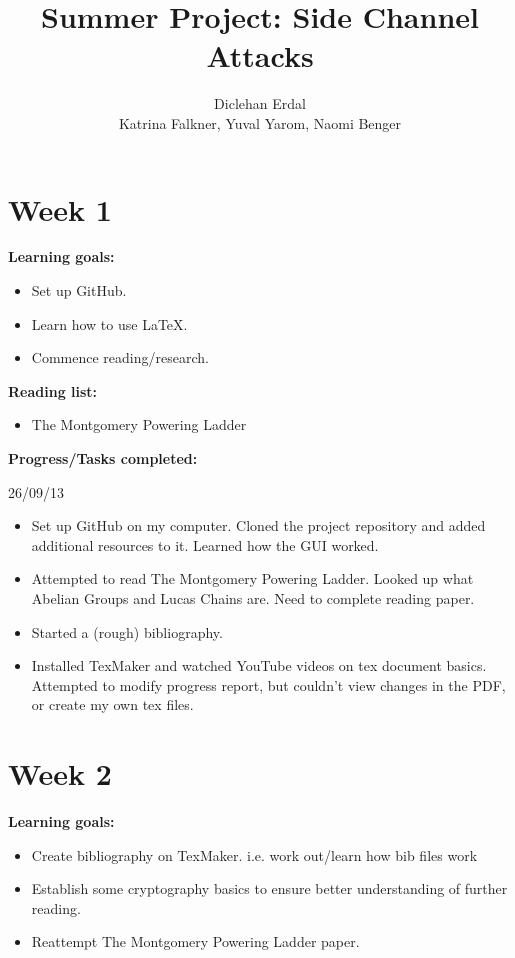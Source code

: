 \documentclass[a4paper, 10pt, envcountsect, runningheads]{article}
\begin{document}
\title{Summer Project: Side Channel Attacks}
\author{Diclehan Erdal\\ Katrina Falkner, Yuval Yarom, Naomi Benger}
\maketitle

\setlength{\parindent}{0pt}


\section*{Week 1}
\textbf{Learning goals:}
\begin{itemize}
\item Set up GitHub.
\item Learn how to use LaTeX.
\item Commence reading/research.
\end{itemize}

\textbf{Reading list:}
\begin{itemize}
\item The Montgomery Powering Ladder
\end{itemize}
\textbf{Progress/Tasks completed:}

26/09/13
\begin{itemize}
\item Set up GitHub on my computer. Cloned the project repository and added additional resources to it. Learned how the GUI worked.
\item Attempted to read The Montgomery Powering Ladder. Looked up what Abelian Groups and Lucas Chains are. Need to complete reading paper.
\item Started a (rough) bibliography.
\item Installed TexMaker and watched YouTube videos on tex document basics. Attempted to modify progress report, but couldn't view changes in the PDF, or create my own tex files. 
\end{itemize}


\newpage
\section*{Week 2}
\textbf{Learning goals:}
\begin{itemize}
\item Create bibliography on TexMaker. i.e. work out/learn how bib files work
\item Establish some cryptography basics to ensure better understanding of further reading.
\item Reattempt The Montgomery Powering Ladder paper.
\end{itemize}
\end{document}
